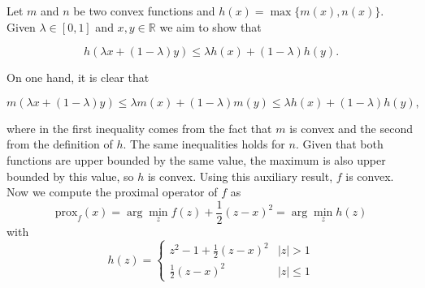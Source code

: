 \documentclass[12pt]{scrartcl}
\begin{document}
Let $m$ and $n$ be two convex functions and $h(x) = \max\{m(x), n(x)\}$. Given $\lambda \in [0,1]$ and $x, y \in \mathbb{R}$ we aim to show that 

\[
    h(\lambda x + (1- \lambda)y) \leq \lambda h(x) + (1- \lambda)h(y).
\]

On one hand, it is clear that 

\[
    m\left(\lambda x + (1- \lambda)y \right) \leq  \lambda m(x) + (1- \lambda)m(y) \leq  \lambda h(x) + (1- \lambda)h(y),
\]

where in the first inequality comes from the fact that $m$ is convex and the second from the definition of $h$. The same inequalities holds for $n$. Given that both functions are upper bounded by the same value, the maximum is also upper bounded by this value, so $h$ is convex. Using this auxiliary result, $f$ is convex. \\



Now we compute the proximal operator of $f$ as 
\[
    \mbox{prox}_f(x) = \arg \min_z f(z) + \frac 1 2 (z - x)^2 = \arg \min_z h(z)
\]
with
\begin{equation}\label{eq:1}
h(z) = \begin{cases}
        z^2 - 1 + \frac 1 2 (z - x)^2 & |z| > 1 \\
        \frac 1 2 (z - x)^2 & |z| \leq 1 \end{cases}
\end{equation}

\vspace{0.5em}
\end{document}
